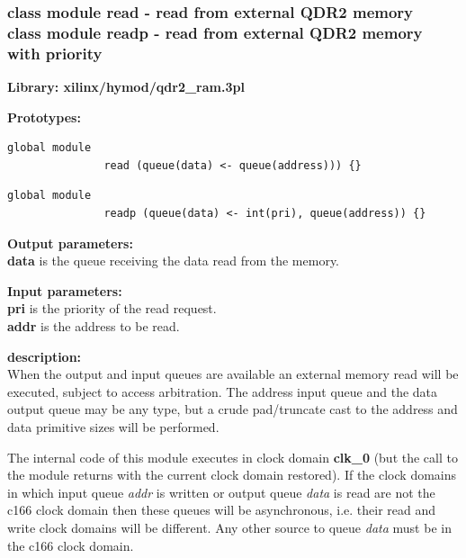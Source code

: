         \subsubsection{class module read - read from external QDR2 memory\\
                       class module readp - read from external QDR2 memory with priority}\label{sec:lcqdr2ramread}

            {\bf Library: xilinx/hymod/qdr2\_ram.3pl}

            {\bf Prototypes:} \\
            \vsp
            \begin{lstlisting}[gobble=12, language=threepl]
               global module
               read (queue(data) <- queue(address))) {}
            \end{lstlisting}
            \begin{lstlisting}[gobble=12, language=threepl]
               global module
               readp (queue(data) <- int(pri), queue(address)) {}
            \end{lstlisting}

            {\bf Output parameters:} \\
            {\bf data} is the queue receiving the data read from the memory.

            {\bf Input parameters:} \\
            {\bf pri} is the priority of the read request. \\
            {\bf addr} is the address to be read.

            {\bf description:} \\
            When the output and input queues are available an external memory
            read will be executed, subject to access arbitration. The address
            input queue and the data output queue may be any type, but a
            crude pad/truncate cast to the address and data primitive sizes
            will be performed.
            
            The internal code of this module executes in clock domain {\bf clk\_0}
            (but the call to the module returns with the current clock domain
            restored). If the clock domains in which input queue {\em addr} is
            written or output queue {\em data} is read are not the c166 clock
            domain then these queues will be asynchronous, i.e. their read and
            write clock domains will be different. Any other source to queue {\em
            data} must be in the c166 clock domain.
            
